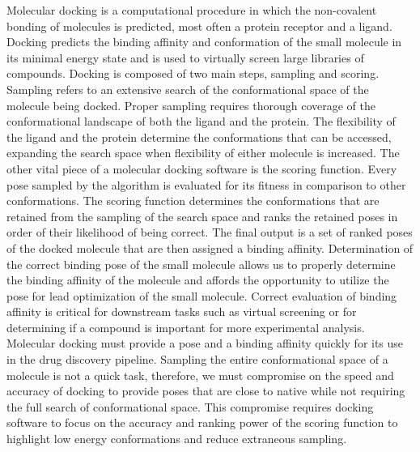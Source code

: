 \documentclass[journal=jcisd8,manuscript=article]{achemso}
\begin{document}
Molecular docking is a computational procedure in which the non-covalent bonding of molecules is predicted, most often a protein receptor and a ligand. Docking predicts the binding affinity and conformation of the small molecule in its minimal energy state and is used to virtually screen large libraries of compounds\cite{kitchen2004docking,leach2006prediction,lyu2019ultra}. Docking is composed of two main steps, sampling and scoring. Sampling refers to an extensive search of the conformational space of the molecule being docked. Proper sampling requires thorough coverage of the conformational landscape of both the ligand and the protein. The flexibility of the ligand and the protein determine the conformations that can be accessed, expanding the search space when flexibility of either molecule is increased. The other vital piece of a molecular docking software is the scoring function. Every pose sampled by the algorithm is evaluated for its fitness in comparison to other conformations. The scoring function determines the conformations that are retained from the sampling of the search space and ranks the retained poses in order of their likelihood of being correct. The final output is a set of ranked poses of the docked molecule that are then assigned a binding affinity. Determination of the correct binding pose of the small molecule allows us to properly determine the binding affinity of the molecule and affords the opportunity to utilize the pose for lead optimization of the small molecule. Correct evaluation of binding affinity is critical for downstream tasks such as virtual screening or for determining if a compound is important for more experimental analysis. Molecular docking must provide a pose and a binding affinity quickly for its use in the drug discovery pipeline. Sampling the entire conformational space of a molecule is not a quick task, therefore, we must compromise on the speed and accuracy of docking to provide poses that are close to native while not requiring the full search of conformational space. This compromise requires docking software to focus on the accuracy and ranking power of the scoring function to highlight low energy conformations and reduce extraneous sampling.
\end{document}
